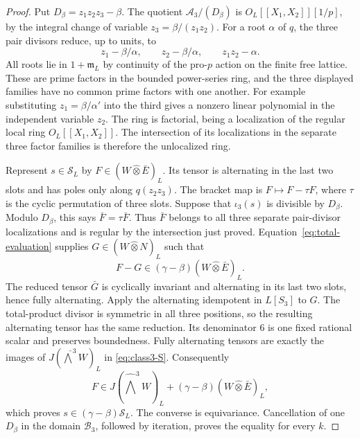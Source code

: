\documentclass[11pt]{article}
\theoremstyle{definition}\newtheorem{definition}[theorem]{Definition}
\begin{document}
\begin{proof}
Put $D_\beta=z_1z_2z_3-\beta$.
The quotient $\mathcal A_3/(D_\beta)$ is
$O_L[[X_1,X_2]][1/p]$, by the integral change of
variable $z_3=\beta/(z_1z_2)$. For a root $\alpha$ of $q$,
the three pair divisors reduce, up to units, to
\[
 z_1-\beta/\alpha,\qquad z_2-\beta/\alpha,\qquad
                                  z_1z_2-\alpha.
\]
All roots lie in $1+\mathfrak m_L$ by continuity of the
pro-$p$ action on the finite free lattice.
These are prime factors in the bounded power-series
ring, and the three displayed families have no common
prime factors with one another. For example substituting
$z_1=\beta/\alpha'$ into the third gives a nonzero linear
polynomial in the independent variable $z_2$.
The ring is factorial, being a localization of the
regular local ring $O_L[[X_1,X_2]]$.
The intersection of its localizations in the separate
three factor families is therefore the unlocalized ring.

Represent $s\in\mathcal S_L$ by
$F\in(W\widehat\otimes\bar E)_L$.
Its tensor is alternating in the last two slots and
has poles only along $q(z_2z_3)$.
The bracket map is $F\mapsto F-\tau F$, where
$\tau$ is the cyclic permutation of three slots.
Suppose that $\iota_3(s)$ is divisible by $D_\beta$.
Modulo $D_\beta$, this says $\bar F=\tau\bar F$.
Thus $\bar F$ belongs to all three separate pair-divisor
localizations and is regular by the intersection just proved.
Equation~\eqref{eq:total-evaluation} supplies
$G\in(W\widehat\otimes N)_L$ such that
\[
 F-G\in(\gamma-\beta)(W\widehat\otimes\bar E)_L.
\]
The reduced tensor $\bar G$ is cyclically invariant and
alternating in its last two slots, hence fully alternating.
Apply the alternating idempotent in $L[S_3]$ to $G$.
The total-product divisor is symmetric in all three
positions, so the resulting alternating tensor has the
same reduction. Its denominator $6$ is one fixed rational
scalar and preserves boundedness. Fully alternating
tensors are exactly the images of
$J(\widehat{\bigwedge}^3W)_L$ in
\eqref{eq:class3-S}. Consequently
\[
 F\in J(\widehat{\bigwedge}^3W)_L
             +(\gamma-\beta)(W\widehat\otimes\bar E)_L,
\]
which proves $s\in(\gamma-\beta)\mathcal S_L$.
The converse is equivariance. Cancellation of one
$D_\beta$ in the domain $\mathcal B_3$, followed by
iteration, proves the equality for every $k$.
\end{proof}
\end{document}
